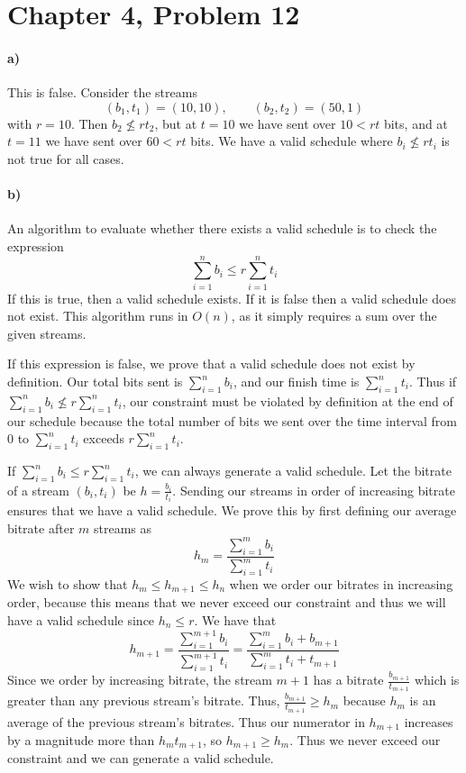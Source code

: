 \documentclass[12pt]{article}
\begin{document}
\pagebreak

\section*{Chapter 4, Problem 12}

\paragraph{a)}

This is false. Consider the streams
\[(b_1,t_1)=(10,10),\qquad(b_2,t_2)=(50,1)\]
with \(r=10\). Then \(b_2\nleq rt_2\), but at \(t=10\) we have sent over \(10<rt\) bits, and at \(t=11\) we have sent over \(60<rt\) bits. We have a valid
schedule where \(b_i\nleq rt_i\) is not true for all cases.

\paragraph{b)}

An algorithm to evaluate whether there exists a valid schedule is to check the expression
\[\sum_{i=1}^n b_i \leq r\sum_{i=1}^n t_i\]
If this is true, then a valid schedule exists. If it is false then a valid schedule does not exist. This algorithm runs in \(O(n)\), as it simply
requires a sum over the given streams.

If this expression is false, we prove that a valid schedule does not exist by definition. Our total bits sent is \(\sum_{i=1}^n b_i\), and our finish time
is \(\sum_{i=1}^n t_i\). Thus if \(\sum_{i=1}^n b_i \nleq r\sum_{i=1}^n t_i\), our constraint must be violated by definition at
the end of our schedule because the total number of bits we sent over the time interval from \(0\) to \(\sum_{i=1}^n t_i\) exceeds \(r\sum_{i=1}^n t_i\).

If \(\sum_{i=1}^n b_i \leq r\sum_{i=1}^n t_i\), we can always generate a valid schedule. Let the bitrate of a stream \((b_i,t_i)\) be \(h=\frac{b_i}{t_i}\).
Sending our streams in order of increasing bitrate ensures that we have a valid schedule. We prove this by first defining our average bitrate after \(m\)
streams as
\[h_m=\frac{\sum_{i=1}^m b_i}{\sum_{i=1}^m t_i}\]
We wish to show that \(h_m\leq h_{m+1}\leq h_n\) when we order our bitrates in increasing order, because this means that we never exceed our constraint and
thus we will have a valid schedule since \(h_n\leq r\). We have that
\[h_{m+1}=\frac{\sum_{i=1}^{m+1} b_i}{\sum_{i=1}^{m+1} t_i}=\frac{\sum_{i=1}^m b_i+b_{m+1}}{\sum_{i=1}^m t_i+t_{m+1}}\]
Since we order by increasing bitrate, the stream \(m+1\) has a bitrate \(\frac{b_{m+1}}{t_{m+1}}\) which is greater than any previous stream's bitrate.
Thus, \(\frac{b_{m+1}}{t_{m+1}}\geq h_m\) because \(h_m\) is an average of the previous stream's bitrates. Thus our numerator in \(h_{m+1}\) increases
by a magnitude more than \(h_mt_{m+1}\), so \(h_{m+1}\geq h_m\). Thus we never exceed our constraint and we can generate a valid schedule.
\end{document}
